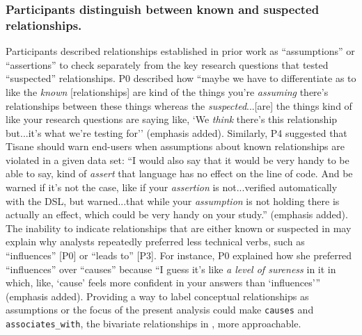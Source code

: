 \subsubsection{Participants distinguish between known and suspected relationships.}
Participants described relationships established in prior work as
``assumptions'' or ``assertions'' to check separately from the key research
questions that tested ``suspected'' relationships. P0 described how ``maybe we
have to differentiate as to like the \textit{known} [relationships] are kind of
the things you're \textit{assuming} there's relationships between these things
whereas the \textit{suspected}...[are] the things kind of like your research
questions are saying like, `We \textit{think} there's this relationship
but...it's what we're testing for'' (emphasis added). Similarly, P4 suggested
that Tisane should warn end-users when assumptions about known relationships are
violated in a given data set: ``I would also say that it would be very handy to
be able to say, kind of \textit{assert} that language has no effect on the line
of code. And be warned if it's not the case, like if your \textit{assertion} is
not...verified automatically with the DSL, but warned...that while your
\textit{assumption} is not holding there is actually an effect, which could be
very handy on your study.'' (emphasis added). The inability to indicate
relationships that are either known or suspected in \tisane may explain why
analysts repeatedly preferred less technical verbs, such as ``influences'' [P0]
or ``leads to'' [P3]. For instance, P0 explained how she preferred
``influences'' over ``causes'' because ``I guess it's like \textit{a level of
sureness} in it in which, like, `cause' feels more confident in your answers
than `influences''' (emphasis added). Providing a way to label conceptual
relationships as assumptions or the focus of the present analysis could make
\texttt{causes} and \texttt{associates_with}, the bivariate relationships in
\tisane, more approachable. 


